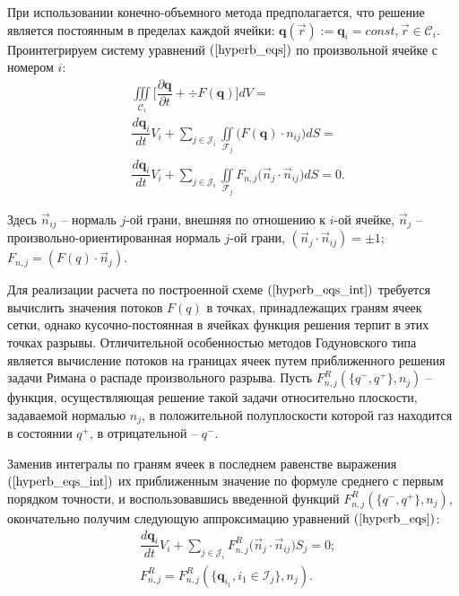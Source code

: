 \documentclass[14pt, a4paper, fleqn]{extreport}
\begin{document}
    При использовании конечно-объемного метода предполагается, что решение является 
    постоянным в пределах каждой ячейки: $\textbf{q}(\vec{r}) := \textbf{q}_i = const, \vec{r} \in \mathcal{C}_i$.
    Проинтегрируем систему уравнений $(\ref{hyperb_eqs})$ по произвольной ячейке с номером $i$:
    \begin{equation}
    \label{hyperb_eqs_int}
    \begin{split}
        &\iiint\limits_{\mathcal{C}_i} \Big[
            \dfrac{\partial \textbf{q}}{\partial t} + \div{F(\textbf{q})} \Big]dV = 
        \\
        &\dfrac{d \textbf{q}_i}{d t}V_i
            + \sum\limits_{j \in \mathcal{J}_i}\iint\limits_{\mathcal{F}_j} \Big( F(\textbf{q}) \cdot n_{ij} \Big) dS =
        \\
        &\dfrac{d \textbf{q}_i}{d t}V_i
            + \sum\limits_{j \in \mathcal{J}_i}\iint\limits_{\mathcal{F}_j} 
                F_{n,j} \Big( \vec{n}_{j} \cdot \vec{n}_{ij} \Big) dS = 0.
    \end{split}
    \end{equation}
    
    Здесь $\vec{n}_{ij}$ -- нормаль $j$-ой грани, внешняя по отношению к $i$-ой ячейке, 
    $\vec{n}_j$ -- произвольно-ориентированная нормаль $j$-ой грани, $(\vec{n}_{j} \cdot \vec{n}_{ij}) = \pm 1$;
    $F_{n,j} = (F(q) \cdot \vec{n}_{j})$.
    
    Для реализации расчета по построенной схеме $(\ref{hyperb_eqs_int})$ требуется вычислить значения потоков $F(q)$ в точках, 
    принадлежащих граням ячеек сетки, однако кусочно-постоянная в ячейках функция решения терпит в этих точках разрывы.
    Отличительной особенностью методов Годуновского типа является вычисление потоков на границах 
    ячеек путем приближенного решения задачи Римана о распаде произвольного разрыва.
    Пусть $F_{n,j}^R(\lbrace q^{-}, q^{+} \rbrace, n_j)$ -- функция, осуществляющая решение такой задачи относительно плоскости, 
    задаваемой нормалью $n_j$,
    в положительной полуплоскости которой газ находится в состоянии $q^{+}$, в отрицательной -- $q^{-}$.
    
    Заменив интегралы по граням ячеек в последнем равенстве выражения $(\ref{hyperb_eqs_int})$ 
    их приближенным значение по формуле среднего с первым порядком точности,
    и воспользовавшись введенной функций $F_{n,j}^R(\lbrace q^{-}, q^{+} \rbrace, n_j)$,
    окончательно получим следующую аппроксимацию уравнений $(\ref{hyperb_eqs})$:
    \begin{equation}
    \label{hyperb_eqs_god} \boxed{
    \begin{split}
        &\dfrac{d \textbf{q}_i}{d t}V_i
            + \sum\limits_{j \in \mathcal{J}_i} F_{n,j}^R \Big( \vec{n}_{j} \cdot \vec{n}_{ij} \Big) S_j = 0;
        \\
        &F_{n,j}^R = F_{n,j}^R(\lbrace \textbf{q}_{i_1}, i_1 \in \mathcal{I}_j \rbrace, n_{j}).
    \end{split}}
    \end{equation}
    
\end{document}
